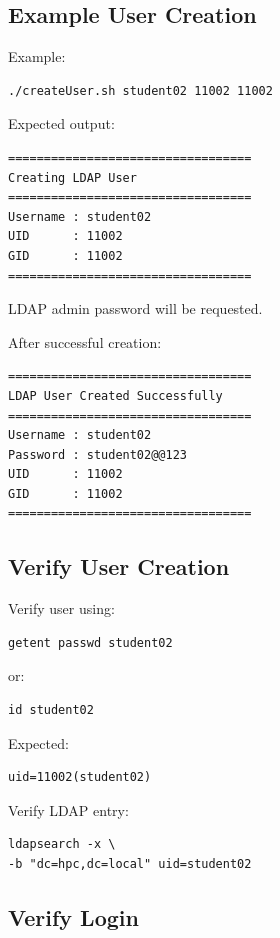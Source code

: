 \documentclass[11pt]{article}
\begin{document}
\subsection{Example User Creation}
\label{sec:orge27791d}

Example:

\begin{verbatim}
./createUser.sh student02 11002 11002
\end{verbatim}

Expected output:

\begin{verbatim}
==================================
Creating LDAP User
==================================
Username : student02
UID      : 11002
GID      : 11002
==================================
\end{verbatim}

LDAP admin password will be requested.

After successful creation:

\begin{verbatim}
==================================
LDAP User Created Successfully
==================================
Username : student02
Password : student02@@123
UID      : 11002
GID      : 11002
==================================
\end{verbatim}
\subsection{Verify User Creation}
\label{sec:org3ddeece}

Verify user using:

\begin{verbatim}
getent passwd student02
\end{verbatim}

or:

\begin{verbatim}
id student02
\end{verbatim}

Expected:

\begin{verbatim}
uid=11002(student02)
\end{verbatim}

Verify LDAP entry:

\begin{verbatim}
ldapsearch -x \
-b "dc=hpc,dc=local" uid=student02
\end{verbatim}
\subsection{Verify Login}
\label{sec:org8c44f50}
\end{document}
